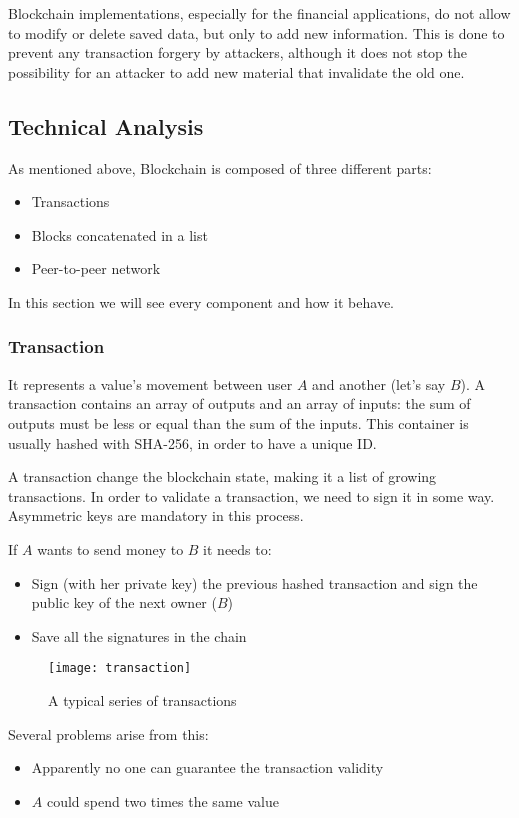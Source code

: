 Blockchain implementations, especially for the financial applications, do not
allow to modify or delete saved data, but only to add new information. This is
done to prevent any transaction forgery by attackers, although it does not stop
the possibility for an attacker to add new material that invalidate the old one.

\subsection{Technical Analysis}

As mentioned above, Blockchain is composed of three different
parts\cite{sok15}:
\begin{itemize}
 \item Transactions
 \item Blocks concatenated in a list
 \item Peer-to-peer network
\end{itemize}

In this section we will see every component and how it behave.

\subsubsection{Transaction}
It represents a value's movement between user $A$ and another (let's
say $B$). A transaction contains an array of outputs and an array of
inputs\cite{sok15}: the sum of outputs must be less or equal than the sum of
the inputs.
This container is usually hashed with SHA-256, in order to have a
unique ID.

A transaction change the blockchain state, making it a list of growing
transactions.
In order to validate a transaction, we need to sign it in some way. Asymmetric
keys are mandatory in this process.

If $A$ wants to send money to $B$ it needs to:
\begin{itemize}
 \item Sign (with her private key) the previous hashed transaction and sign the
public key of the next owner ($B$)
 \item Save all the signatures in the chain
\end{itemize}

\begin{figure}[ht]
 \centering
 \texttt{[image: transaction]}
 \caption{A typical series of transactions}
\end{figure}

Several problems arise from this:
\begin{itemize}
 \item Apparently no one can guarantee the transaction validity
 \item $A$ could spend two times the same value
\end{itemize}


